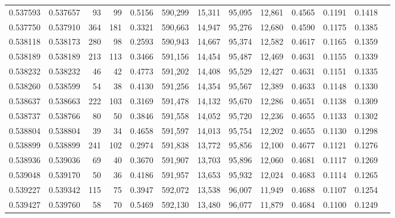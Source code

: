 \begin{tabular}{rrrrrrrrrrrrr}
0.537593 & 0.537657 &    93 &    99 &                                     0.5156 & 590,299 &  15,311 &  95,095 &  12,861 & 0.4565 & 0.1191 & 0.1418 \\
0.537750 & 0.537910 &   364 &   181 &                                     0.3321 & 590,663 &  14,947 &  95,276 &  12,680 & 0.4590 & 0.1175 & 0.1385 \\
0.538118 & 0.538173 &   280 &    98 &                                     0.2593 & 590,943 &  14,667 &  95,374 &  12,582 & 0.4617 & 0.1165 & 0.1359 \\
0.538189 & 0.538189 &   213 &   113 &                                     0.3466 & 591,156 &  14,454 &  95,487 &  12,469 & 0.4631 & 0.1155 & 0.1339 \\
0.538232 & 0.538232 &    46 &    42 &                                     0.4773 & 591,202 &  14,408 &  95,529 &  12,427 & 0.4631 & 0.1151 & 0.1335 \\
0.538260 & 0.538599 &    54 &    38 &                                     0.4130 & 591,256 &  14,354 &  95,567 &  12,389 & 0.4633 & 0.1148 & 0.1330 \\
0.538637 & 0.538663 &   222 &   103 &                                     0.3169 & 591,478 &  14,132 &  95,670 &  12,286 & 0.4651 & 0.1138 & 0.1309 \\
0.538737 & 0.538766 &    80 &    50 &                                     0.3846 & 591,558 &  14,052 &  95,720 &  12,236 & 0.4655 & 0.1133 & 0.1302 \\
0.538804 & 0.538804 &    39 &    34 &                                     0.4658 & 591,597 &  14,013 &  95,754 &  12,202 & 0.4655 & 0.1130 & 0.1298 \\
0.538899 & 0.538899 &   241 &   102 &                                     0.2974 & 591,838 &  13,772 &  95,856 &  12,100 & 0.4677 & 0.1121 & 0.1276 \\
0.538936 & 0.539036 &    69 &    40 &                                     0.3670 & 591,907 &  13,703 &  95,896 &  12,060 & 0.4681 & 0.1117 & 0.1269 \\
0.539048 & 0.539170 &    50 &    36 &                                     0.4186 & 591,957 &  13,653 &  95,932 &  12,024 & 0.4683 & 0.1114 & 0.1265 \\
0.539227 & 0.539342 &   115 &    75 &                                     0.3947 & 592,072 &  13,538 &  96,007 &  11,949 & 0.4688 & 0.1107 & 0.1254 \\
0.539427 & 0.539760 &    58 &    70 &                                     0.5469 & 592,130 &  13,480 &  96,077 &  11,879 & 0.4684 & 0.1100 & 0.1249 \\

\end{tabular}
